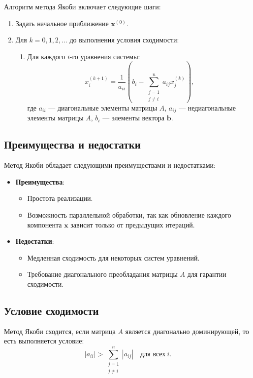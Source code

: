\documentclass{article}
\begin{document}
Алгоритм метода Якоби включает следующие шаги:
\begin{enumerate}
    \item Задать начальное приближение \(\mathbf{x}^{(0)}\).
    \item Для \(k = 0, 1, 2, \ldots\) до выполнения условия сходимости:
    \begin{enumerate}
        \item Для каждого \(i\)-го уравнения системы:
        \[
        x_i^{(k+1)} = \frac{1}{a_{ii}} \left( b_i - \sum_{\substack{j=1 \\ j \neq i}}^n a_{ij} x_j^{(k)} \right),
        \]
        где \(a_{ii}\) — диагональные элементы матрицы \(A\), \(a_{ij}\) — недиагональные элементы матрицы \(A\), \(b_i\) — элементы вектора \(\mathbf{b}\).
    \end{enumerate}
\end{enumerate}

\subsection*{Преимущества и недостатки}

Метод Якоби обладает следующими преимуществами и недостатками:

\begin{itemize}
    \item \textbf{Преимущества}:
    \begin{itemize}
        \item Простота реализации.
        \item Возможность параллельной обработки, так как обновление каждого компонента \(\mathbf{x}\) зависит только от предыдущих итераций.
    \end{itemize}
    \item \textbf{Недостатки}:
    \begin{itemize}
        \item Медленная сходимость для некоторых систем уравнений.
        \item Требование диагонального преобладания матрицы \(A\) для гарантии сходимости.
    \end{itemize}
\end{itemize}

\subsection*{Условие сходимости}

Метод Якоби сходится, если матрица \(A\) является диагонально доминирующей, то есть выполняется условие:
\[
|a_{ii}| > \sum_{\substack{j=1 \\ j \neq i}}^n |a_{ij}| \quad \text{для всех} \ i.
\]
\end{document}
